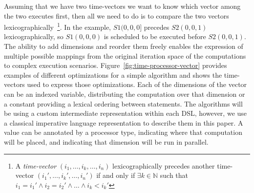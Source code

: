 Assuming that we have two time-\processor vectors we want to know which vector among the two executes first, then all we need to do is to compare the two vectors lexicographically~\footnote{A \emph{time-\processor vector} $(i_1, \dots, i_k, \dots, i_n)$ lexicographically precedes another time-\processor vector $(i_1', \dots, i_k', \dots, i_n')$ if and only if $\exists k \in \mathbb{N}$ such that $i_1 = i_1' \wedge i_2 = i_2' \wedge \dots \wedge i_k < i_k'$}.
In the example, $S1(0,0,0]$ precedes $S2(0,0,1)$ lexicographically, so $S1(0,0,0)$ is scheduled to be executed before $S2(0,0,1)$.
The ability to add dimensions and reorder them freely enables the expression of multiple possible mappings from the original iteration space of the computations to complex execution scenarios.
Figure~\ref{fig:time-processor-vector} provides examples of different optimizations for a simple algorithm and shows the  time-\processor vectors used to express those optimizations.
Each of the dimensions of the vector can be an indexed variable, distributing the computation over that dimension or a constant providing a lexical ordering between statements. 
The algorithms will be using a custom intermediate representation within each DSL, however, we use a classical imperative language representation to describe them in this paper.
A value can be annotated by a processor type, indicating where that computation will be placed, and indicating that dimension will be run in parallel.